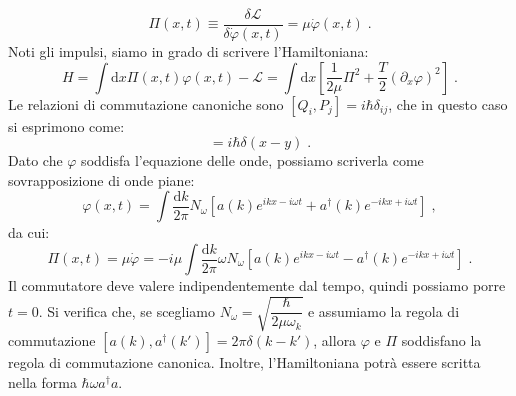 \documentclass[12pt,a4paper]{report}
\theoremstyle{definition}
\newcommand{\lag}{\mathcal{L}}
\numberwithin{equation}{section}
\newcommand{\diff}[1][]{\mathrm{d}#1}
\newcommand{\adj}[1]{#1^{\dagger}}
\begin{document}
\begin{equation}
\Pi(x,t)\equiv \frac{\delta\lag}{\delta\dot{\varphi}(x,t)}=\mu\dot{\varphi}(x,t)\;.
\end{equation}
Noti gli impulsi, siamo in grado di scrivere l'Hamiltoniana:
\begin{equation}
H=\int\diff{x}\Pi(x,t)\varphi(x,t)-\lag=\int\diff{x}\left[\frac{1}{2\mu}\Pi^2+\frac{T}{2}(\partial_x\varphi)^2\right]\;.
\end{equation}
Le relazioni di commutazione canoniche sono $[Q_i,P_j]=i\hbar\delta_{ij}$, che in questo caso si esprimono come:
\begin{equation}
[\varphi(x,t),\Pi(x,t)]=i\hbar\delta(x-y)\;.
\end{equation}
Dato che $\varphi$ soddisfa l'equazione delle onde, possiamo scriverla come sovrapposizione di onde piane:
\begin{equation}
\varphi(x,t)=\int\frac{\diff{k}}{2\pi}N_{\omega}\left[a(k)e^{ikx-i\omega t}+\adj{a}(k)e^{-ikx+i\omega t}\right]\;,
\end{equation}
da cui:
\begin{equation}
\Pi(x,t)=\mu\dot{\varphi}=-i\mu\int\frac{\diff{k}}{2\pi}\omega N_{\omega}\left[a(k)e^{ikx-i\omega t}-\adj{a}(k)e^{-ikx+i\omega t}\right]\;.
\end{equation}
Il commutatore deve valere indipendentemente dal tempo, quindi possiamo porre $t=0$. Si verifica che, se scegliamo $N_{\omega}=\sqrt{\dfrac{\hbar}{2\mu\omega_k}}$ e assumiamo la regola di commutazione $[a(k),\adj{a}(k')]=2\pi\delta(k-k')$, allora $\varphi$ e $\Pi$ soddisfano la regola di commutazione canonica. Inoltre, l'Hamiltoniana potrà essere scritta nella forma $\hbar\omega\adj{a}a$.
\end{document}
